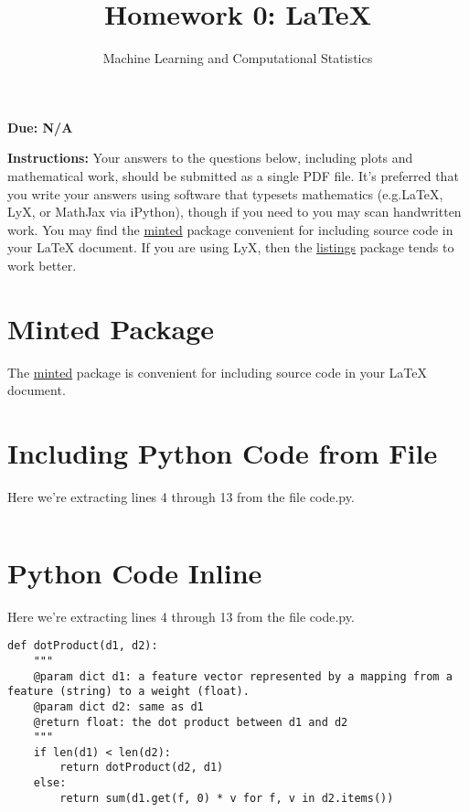 \documentclass[12pt]{article}
\date{}
\begin{document}
 

\title{Homework 0: LaTeX}
\author{%
Machine Learning and Computational Statistics}

\maketitle
\textbf{Due: N/A}

\textbf{Instructions: }Your answers to the questions below, including plots and mathematical
 work, should be submitted as a single PDF file.  It's preferred that you write your answers using software that typesets mathematics (e.g.LaTeX, LyX, or MathJax via iPython), though if you need to you may scan handwritten work.  You may find the \href{https://github.com/gpoore/minted}{minted} package convenient for including source code in your LaTeX document.  If you are using LyX, then the \href{https://en.wikibooks.org/wiki/LaTeX/Source_Code_Listings}{listings} package tends to work better.

\section{Minted Package}
The \href{https://github.com/gpoore/minted}{minted} package is convenient for including source code in your LaTeX document.

\section{Including Python Code from File}
Here we're extracting lines 4 through 13 from the file code.py.
\inputminted[firstline=4, lastline=13, breaklines=True]{python}{code.py}

\section{Python Code Inline}
Here we're extracting lines 4 through 13 from the file code.py.
\begin{verbatim}
def dotProduct(d1, d2):
    """
    @param dict d1: a feature vector represented by a mapping from a feature (string) to a weight (float).
    @param dict d2: same as d1
    @return float: the dot product between d1 and d2
    """
    if len(d1) < len(d2):
        return dotProduct(d2, d1)
    else:
        return sum(d1.get(f, 0) * v for f, v in d2.items())
\end{verbatim}
 
\end{document}
